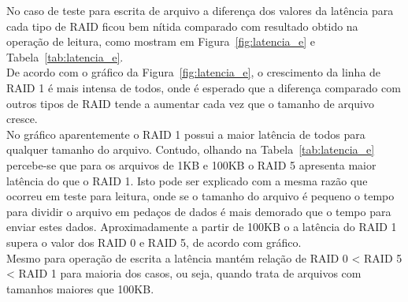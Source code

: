 	
	
	No caso de teste para escrita de arquivo a diferença dos valores da latência para cada tipo de RAID ficou bem nítida comparado com resultado obtido na operação de leitura, como mostram em Figura~\ref{fig:latencia_e} e Tabela~\ref{tab:latencia_e}.
	\\
	
	De acordo com o gráfico da Figura~\ref{fig:latencia_e}, o crescimento da linha de RAID 1 é mais intensa de todos, onde é esperado que a diferença comparado com outros tipos de RAID tende a aumentar cada vez que o tamanho de arquivo cresce.
	\\
	
	No gráfico aparentemente o RAID 1 possui a maior latência de todos para qualquer tamanho do arquivo. Contudo, olhando na Tabela~\ref{tab:latencia_e} percebe-se que para os arquivos de 1KB e 100KB o RAID 5 apresenta maior latência do que o RAID 1. Isto pode ser explicado com a mesma razão que ocorreu em teste para leitura, onde se o tamanho do arquivo é pequeno o tempo para dividir o arquivo em pedaços de dados é mais demorado que o tempo para enviar estes dados. Aproximadamente a partir de 100KB o a latência do RAID 1 supera o valor dos RAID 0 e RAID 5, de acordo com gráfico. 
	\\
	
	Mesmo para operação de escrita a latência mantém relação de RAID 0 < RAID 5 < RAID 1 para maioria dos casos, ou seja, quando trata de arquivos com tamanhos maiores que 100KB.
	\\
	
